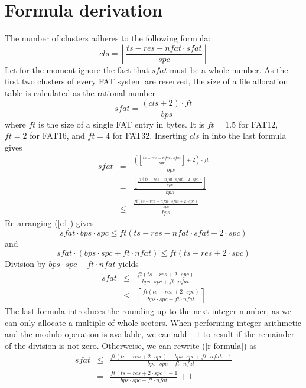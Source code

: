 \documentclass[12pt]{article}
\begin{document}
\section{Formula derivation}
The number of clusters adheres to the following formula:
\begin{equation}
cls = \left\lfloor\frac{ts - res - nfat \cdot sfat}{spc}\right\rfloor
\end{equation}
Let for the moment ignore the fact that $sfat$ must be a whole number. As the first two clusters of every FAT system are reserved, the size of a file allocation table is calculated as the rational number
\begin{equation}
sfat = \frac{(cls + 2) \cdot ft}{bps}
\end{equation}
where $ft$ is the size of a single FAT entry in bytes. It is $ft = 1.5$ for FAT12, $ft = 2$ for FAT16, and $ft = 4$ for FAT32. Inserting $cls$ in into the last formula gives
\begin{eqnarray}
sfat &=& \frac{\left(\left\lfloor\frac{ts - res - nfat \cdot sfat}{spc}\right\rfloor + 2\right) \cdot ft}{bps} \nonumber\\
 &=& \frac{\left\lfloor\frac{ft(ts - res - nfat \cdot sfat +2 \cdot spc)}{spc}\right\rfloor}{bps}\\
 \label{e1}
 &\le& \frac{\frac{ft(ts - res - nfat \cdot sfat +2 \cdot spc)}{spc}}{bps}
\end{eqnarray}
Re-arranging (\ref{e1}) gives
\begin{equation*}
sfat \cdot bps \cdot spc \le ft(ts - res - nfat \cdot sfat +2 \cdot spc)
\end{equation*}
and
\begin{equation*}
sfat \cdot (bps \cdot spc + ft \cdot nfat) \le ft(ts - res + 2 \cdot spc)
\end{equation*}
Division by $bps \cdot spc + ft \cdot nfat$ yields
\begin{eqnarray}
sfat &\le& \frac{ft(ts - res + 2 \cdot spc)}{bps \cdot spc + ft \cdot nfat}\nonumber\\
\label{r-formula}
 &\le& \left\lceil\frac{ft(ts - res + 2 \cdot spc)}{bps \cdot spc + ft \cdot nfat}\right\rceil
\end{eqnarray}
The last formula introduces the rounding up to the next integer number, as we can only allocate a multiple of whole sectors. When performing integer arithmetic and the modulo operation is available, we can add $+1$ to result if the remainder of the division is not zero. Otherweise, we can rewrite (\ref{r-formula}) as
\begin{eqnarray}
sfat &\le& \frac{ft(ts - res + 2 \cdot spc) + bps \cdot spc + ft \cdot nfat - 1}{bps \cdot spc + ft \cdot nfat} \nonumber\\
\label{gen-formula}
 &=& \frac{ft(ts - res + 2 \cdot spc) - 1}{bps \cdot spc + ft \cdot nfat} + 1
\end{eqnarray}
\end{document}
